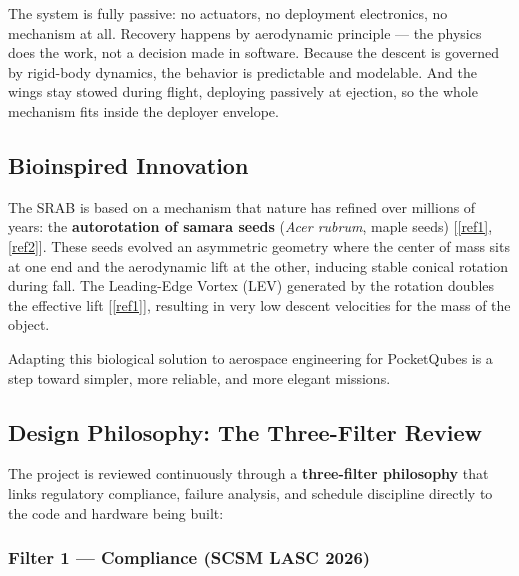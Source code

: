 The system is fully passive: no actuators, no deployment electronics,
no mechanism at all. Recovery happens by aerodynamic principle — the
physics does the work, not a decision made in software. Because the
descent is governed by rigid-body dynamics, the behavior is
predictable and modelable. And the wings stay stowed during flight,
deploying passively at ejection, so the whole mechanism fits inside
the deployer envelope.

\subsection{Bioinspired Innovation}

The SRAB is based on a mechanism that nature has refined over millions
of years: the \textbf{autorotation of samara seeds} (\emph{Acer
rubrum}, maple seeds) [\ref{ref1},\ref{ref2}]. These seeds evolved an asymmetric geometry
where the center of mass sits at one end and the aerodynamic lift at
the other, inducing stable conical rotation during fall. The
Leading-Edge Vortex (LEV) generated by the rotation doubles the
effective lift [\ref{ref1}], resulting in very low descent velocities for the
mass of the object.

Adapting this biological solution to aerospace engineering for
PocketQubes is a step toward simpler, more reliable, and more
elegant missions.

\subsection{Design Philosophy: The Three-Filter Review}

The project is reviewed continuously through a \textbf{three-filter
philosophy} that links regulatory compliance, failure analysis, and
schedule discipline directly to the code and hardware being built:

\subsubsection{Filter 1 — Compliance (SCSM LASC 2026)}

